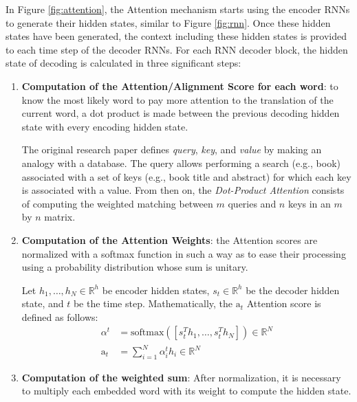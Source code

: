 In Figure \ref{fig:attention}, the Attention mechanism starts using the encoder
RNNs to generate their hidden states, similar to Figure \ref{fig:rnn}. Once
these hidden states have been generated, the context including these hidden
states is provided to each time step of the decoder RNNs. For each RNN decoder
block, the hidden state of decoding is calculated in three significant steps:
\begin{enumerate}
\item \textbf{Computation of the Attention/Alignment Score for each word}: to
  know the most likely word to pay more attention to the translation of the
  current word, a dot product is made between the previous decoding hidden state
  with every encoding hidden state.

  The original research paper defines \emph{query}, \emph{key}, and \emph{value}
  by making an analogy with a database. The query allows performing a search
  (e.g., book) associated with a set of keys (e.g., book title and abstract) for
  which each key is associated with a value. From then on, the \emph{Dot-Product
    Attention} consists of computing the weighted matching between $m$ queries and
  $n$ keys in an $m$ by $n$ matrix.

\item \textbf{Computation of the Attention Weights}: the Attention scores are
  normalized with a softmax function in such a way as to ease their processing
  using a probability distribution whose sum is unitary.
  \begin{definition}
    Let $h_1, \ldots, h_N \in \mathbb{R}^h$ be encoder hidden states, $s_t \in
    \mathbb{R}^h$ be the decoder hidden state, and $t$ be the time
    step. Mathematically, the $\mathrm{a}_t$ Attention score is defined as follows:
    \begin{align}
      \alpha^t &= \mathrm{softmax}\left(\left[  s_t^Th_1, \ldots, s_t^Th_N \right]\right) \in \mathbb{R}^N \\
      \mathrm{a}_t &= \sum^N_{i=1}\alpha^t_ih_i \in \mathbb{R}^N
      \label{eq:def:attention:score}
    \end{align}
    \label{def:attention:score}
  \end{definition}

\item \textbf{Computation of the weighted sum}: After normalization, it is
necessary to multiply each embedded word with its weight to compute the hidden
state.
\end{enumerate}

